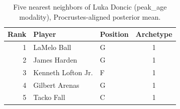 \begin{table}[htbp]
  \centering\small
  \begin{tabular}{rllc}
    \toprule
    Rank & Player & Position & Archetype \\
    \midrule
    1 & LaMelo Ball & G & 1 \\
    2 & James Harden & G & 1 \\
    3 & Kenneth Lofton Jr. & F & 1 \\
    4 & Gilbert Arenas & G & 1 \\
    5 & Tacko Fall & C & 1 \\
    \bottomrule
  \end{tabular}
  \caption{Five nearest neighbors of Luka Doncic (peak_age modality), Procrustes-aligned posterior mean.}
  \label{tab:Luka_Doncic_neighbors_peak_age}
\end{table}

